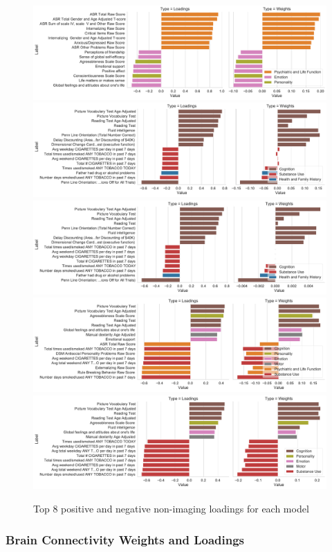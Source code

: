 \begin{figure}
\centering
\includegraphics[width=0.8\linewidth]{figures/hcp/PCA behaviour weights and loadings}
\includegraphics[width=0.8\linewidth]{figures/hcp/RCCA behaviour weights and loadings}
\includegraphics[width=0.8\linewidth]{figures/hcp/ElasticNet behaviour weights and loadings}
\includegraphics[width=0.8\linewidth]{figures/hcp/PLS behaviour weights and loadings}
\includegraphics[width=0.8\linewidth]{figures/hcp/SPLS behaviour weights and loadings}
\caption{Top 8 positive and negative non-imaging loadings for each model}
\end{figure}

\subsubsection{Brain Connectivity Weights and Loadings}

